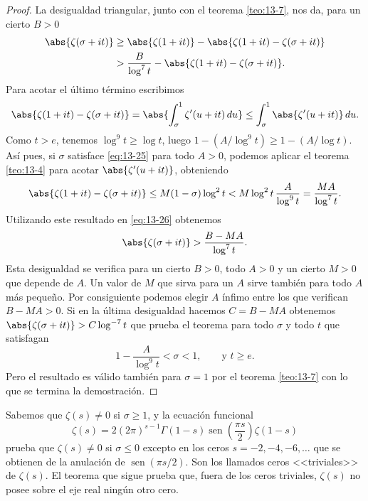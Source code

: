     \begin{proof}
        La desigualdad triangular, junto con el teorema \ref{teo:13-7}, nos da, para un cierto
        $B>0$
        \begin{align}
            \abs{\zeta(\sigma+it)}&\geq\abs{\zeta(1+it)}-\abs{\zeta(1+it)-\zeta(\sigma+it)}\notag\\
            &>\frac{B}{\log^7t}-\abs{\zeta(1+it)-\zeta(\sigma+it)}.\label{eq:13-26}
        \end{align}
        Para acotar el último término escribimos
        \begin{equation*}
            \abs{\zeta(1+it)-\zeta(\sigma+it)}=\abs{\int_{\sigma}^1\zeta'(u+it)\,du}\leq\int_{\sigma}^1\abs{\zeta'(u+it)}\,du.
        \end{equation*}
        Como $t>e$, tenemos $\log^9t\geq\log t$, luego $1-(A/\log^9t)\geq1-(A/\log t)$. Así
        pues, si $\sigma$ satisface \eqref{eq:13-25} para todo $A>0$, podemos aplicar el teorema
        \ref{teo:13-4} para acotar $\abs{\zeta'(u+it)}$, obteniendo
        \begin{equation*}
            \abs{\zeta(1+it)-\zeta(\sigma+it)}\leq M(1-\sigma)\log^2t<M\log^2t\,\frac{A}{\log^9t}=\frac{MA}{\log^7t}.
        \end{equation*}
        Utilizando este resultado en \eqref{eq:13-26} obtenemos
        \begin{equation*}
            \abs{\zeta(\sigma+it)}>\frac{B-MA}{\log^7t}.
        \end{equation*}
        Esta desigualdad se verifica para un cierto $B>0$, todo $A>0$ y un cierto $M>0$ que
        depende de $A$. Un valor de $M$ que sirva para un $A$ sirve también para todo $A$ más
        pequeño. Por consiguiente podemos elegir $A$ ínfimo entre los que verifican
        $B-MA>0$. Si en la última desigualdad hacemos $C=B-MA$ obtenemos
        $\abs{\zeta(\sigma+it)}>C\log^{-7}t$ que prueba el teorema para todo $\sigma$ y todo
        $t$ que satisfagan
        \begin{equation*}
            1-\frac{A}{\log^9t}<\sigma<1,\qquad\text{y }t\geq e.
        \end{equation*}
        Pero el resultado es válido también para $\sigma=1$ por el teorema \ref{teo:13-7} con
        lo que se termina la demostración.
    \end{proof}

    Sabemos que $\zeta(s)\neq0$ si $\sigma\geq1$, y la ecuación funcional
    \begin{equation*}
        \zeta(s)=2(2\pi)^{s-1}\Gamma(1-s)\operatorname{sen}\left(\frac{\pi s}{2}\right)\zeta(1-s)
    \end{equation*}
    prueba que $\zeta(s)\neq0$ si $\sigma\leq0$ excepto en los ceros $s=-2,-4,-6,\dots$ que se
    obtienen de la anulación de $\operatorname{sen}(\pi s/2)$. Son los llamados ceros
    <<triviales>> de $\zeta(s)$. El teorema que sigue prueba que, fuera de los ceros
    triviales, $\zeta(s)$ no posee sobre el eje real ningún otro cero.

